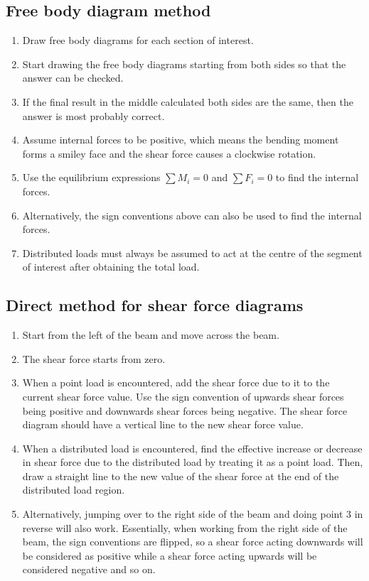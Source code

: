 \documentclass[11pt]{article}
\begin{document}
\subsection{Free body diagram method}
\label{sec:org1298b65}
\begin{enumerate}
\item Draw free body diagrams for each section of interest.
\item Start drawing the free body diagrams starting from both sides so that the answer can be checked.
\item If the final result in the middle calculated both sides are the same, then the answer is most probably correct.
\item Assume internal forces to be positive, which means the bending moment forms a smiley face and the shear force causes a clockwise rotation.
\item Use the equilibrium expressions \(\sum M_i = 0\) and \(\sum F_i = 0\) to find the internal forces.
\item Alternatively, the sign conventions above can also be used to find the internal forces.
\item Distributed loads must always be assumed to act at the centre of the segment of interest after obtaining the total load.
\end{enumerate}

\newpage
\subsection{Direct method for shear force diagrams}
\label{sec:org66ffa51}
\begin{enumerate}
\item Start from the left of the beam and move across the beam.
\item The shear force starts from zero.
\item When a point load is encountered, add the shear force due to it to the current shear force value. Use the sign convention of upwards shear forces being positive and downwards shear forces being negative. The shear force diagram should have a vertical line to the new shear force value.
\item When a distributed load is encountered, find the effective increase or decrease in shear force due to the distributed load by treating it as a point load. Then, draw a straight line to the new value of the shear force at the end of the distributed load region.
\item Alternatively, jumping over to the right side of the beam and doing point 3 in reverse will also work. Essentially, when working from the right side of the beam, the sign conventions are flipped, so a shear force acting downwards will be considered as positive while a shear force acting upwards will be considered negative and so on.
\end{enumerate}
\end{document}
